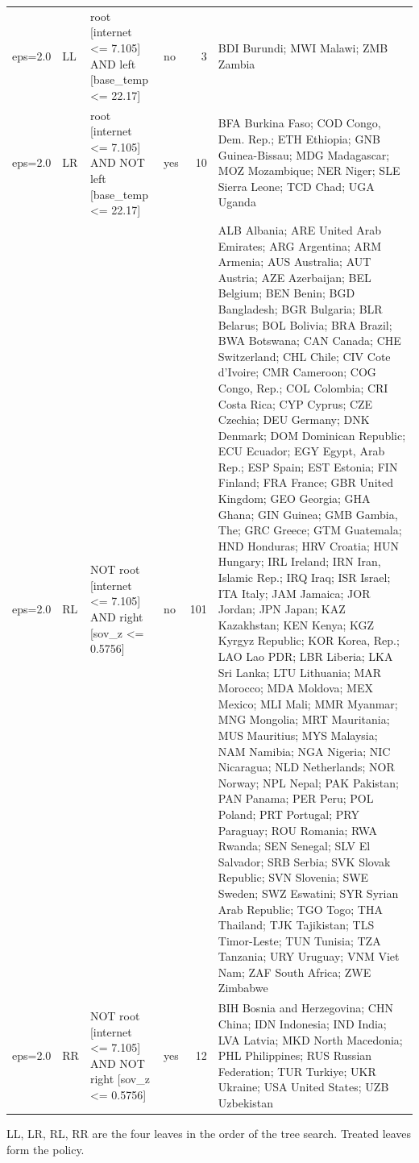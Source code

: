 \begin{table}[htbp]
\begin{tabular}{llllrp{9cm}}
eps=2.0 & LL & root [internet <= 7.105] AND left [base\_temp <= 22.17] & no & 3 & BDI Burundi; MWI Malawi; ZMB Zambia \\
eps=2.0 & LR & root [internet <= 7.105] AND NOT left [base\_temp <= 22.17] & yes & 10 & BFA Burkina Faso; COD Congo, Dem. Rep.; ETH Ethiopia; GNB Guinea-Bissau; MDG Madagascar; MOZ Mozambique; NER Niger; SLE Sierra Leone; TCD Chad; UGA Uganda \\
eps=2.0 & RL & NOT root [internet <= 7.105] AND right [sov\_z <= 0.5756] & no & 101 & ALB Albania; ARE United Arab Emirates; ARG Argentina; ARM Armenia; AUS Australia; AUT Austria; AZE Azerbaijan; BEL Belgium; BEN Benin; BGD Bangladesh; BGR Bulgaria; BLR Belarus; BOL Bolivia; BRA Brazil; BWA Botswana; CAN Canada; CHE Switzerland; CHL Chile; CIV Cote d'Ivoire; CMR Cameroon; COG Congo, Rep.; COL Colombia; CRI Costa Rica; CYP Cyprus; CZE Czechia; DEU Germany; DNK Denmark; DOM Dominican Republic; ECU Ecuador; EGY Egypt, Arab Rep.; ESP Spain; EST Estonia; FIN Finland; FRA France; GBR United Kingdom; GEO Georgia; GHA Ghana; GIN Guinea; GMB Gambia, The; GRC Greece; GTM Guatemala; HND Honduras; HRV Croatia; HUN Hungary; IRL Ireland; IRN Iran, Islamic Rep.; IRQ Iraq; ISR Israel; ITA Italy; JAM Jamaica; JOR Jordan; JPN Japan; KAZ Kazakhstan; KEN Kenya; KGZ Kyrgyz Republic; KOR Korea, Rep.; LAO Lao PDR; LBR Liberia; LKA Sri Lanka; LTU Lithuania; MAR Morocco; MDA Moldova; MEX Mexico; MLI Mali; MMR Myanmar; MNG Mongolia; MRT Mauritania; MUS Mauritius; MYS Malaysia; NAM Namibia; NGA Nigeria; NIC Nicaragua; NLD Netherlands; NOR Norway; NPL Nepal; PAK Pakistan; PAN Panama; PER Peru; POL Poland; PRT Portugal; PRY Paraguay; ROU Romania; RWA Rwanda; SEN Senegal; SLV El Salvador; SRB Serbia; SVK Slovak Republic; SVN Slovenia; SWE Sweden; SWZ Eswatini; SYR Syrian Arab Republic; TGO Togo; THA Thailand; TJK Tajikistan; TLS Timor-Leste; TUN Tunisia; TZA Tanzania; URY Uruguay; VNM Viet Nam; ZAF South Africa; ZWE Zimbabwe \\
eps=2.0 & RR & NOT root [internet <= 7.105] AND NOT right [sov\_z <= 0.5756] & yes & 12 & BIH Bosnia and Herzegovina; CHN China; IDN Indonesia; IND India; LVA Latvia; MKD North Macedonia; PHL Philippines; RUS Russian Federation; TUR Turkiye; UKR Ukraine; USA United States; UZB Uzbekistan \\
\bottomrule
\end{tabular}
\par\smallskip\footnotesize LL, LR, RL, RR are the four leaves in the order of the tree search. Treated leaves form the policy.
\end{table}
